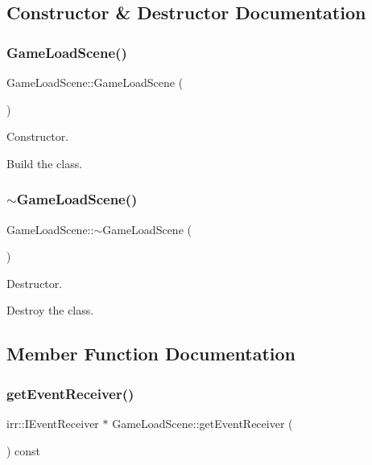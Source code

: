 \subsection{Constructor \& Destructor Documentation}
\mbox{\label{classGameLoadScene_a225786d3826577aa3743164b6262dc2b}} 
\subsubsection{\texorpdfstring{Game\+Load\+Scene()}{GameLoadScene()}}
{\footnotesize\ttfamily Game\+Load\+Scene\+::\+Game\+Load\+Scene (\begin{DoxyParamCaption}{ }\end{DoxyParamCaption})}



Constructor. 

Build the class. \mbox{\label{classGameLoadScene_a39c0f378455520c08d21e0642f35cd9b}} 
\subsubsection{\texorpdfstring{$\sim$\+Game\+Load\+Scene()}{~GameLoadScene()}}
{\footnotesize\ttfamily Game\+Load\+Scene\+::$\sim$\+Game\+Load\+Scene (\begin{DoxyParamCaption}{ }\end{DoxyParamCaption})}



Destructor. 

Destroy the class. 

\subsection{Member Function Documentation}
\mbox{\label{classGameLoadScene_a81807790ad65bd2cf97a1e543cae2b74}} 
\subsubsection{\texorpdfstring{get\+Event\+Receiver()}{getEventReceiver()}}
{\footnotesize\ttfamily irr\+::\+I\+Event\+Receiver $\ast$ Game\+Load\+Scene\+::get\+Event\+Receiver (\begin{DoxyParamCaption}{ }\end{DoxyParamCaption}) const\hspace{0.3cm}{\ttfamily [virtual]}}



